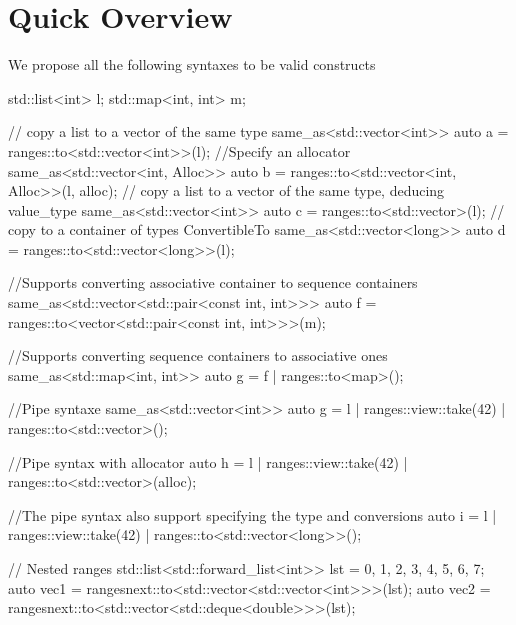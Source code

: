 \documentclass{wg21}
\begin{document}
\section{Quick Overview}
We propose all the following syntaxes to be valid constructs

\begin{colorblock}
std::list<int>  l;
std::map<int, int> m;

// copy a list to a vector of the same type
same_as<std::vector<int>> auto a = ranges::to<std::vector<int>>(l);
//Specify an allocator
same_as<std::vector<int, Alloc>> auto b = ranges::to<std::vector<int, Alloc>>(l, alloc);
// copy a list to a vector of the same type, deducing value_type
same_as<std::vector<int>> auto c = ranges::to<std::vector>(l);
// copy to a container of types ConvertibleTo
same_as<std::vector<long>> auto d = ranges::to<std::vector<long>>(l);


//Supports converting associative container to sequence containers
same_as<std::vector<std::pair<const int, int>>>
	auto f = ranges::to<vector<std::pair<const int, int>>>(m);

//Supports converting sequence containers to associative ones
same_as<std::map<int, int>> auto g = f | ranges::to<map>();

//Pipe syntaxe
same_as<std::vector<int>> auto g = l | ranges::view::take(42) | ranges::to<std::vector>();

//Pipe syntax with allocator
auto h = l | ranges::view::take(42) | ranges::to<std::vector>(alloc);

//The pipe syntax also support specifying the type and conversions
auto i = l | ranges::view::take(42) | ranges::to<std::vector<long>>();

// Nested ranges
std::list<std::forward_list<int>> lst = {{0, 1, 2, 3}, {4, 5, 6, 7}};
auto vec1 = rangesnext::to<std::vector<std::vector<int>>>(lst);
auto vec2 = rangesnext::to<std::vector<std::deque<double>>>(lst);

\end{colorblock}

\pagebreak
\end{document}
